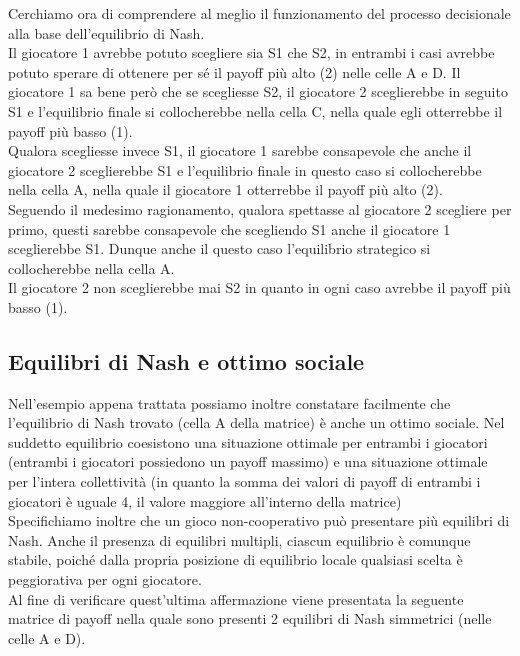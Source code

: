 \begin{flushleft}
Cerchiamo ora di comprendere al meglio il funzionamento del processo decisionale alla base dell'equilibrio di Nash.\\
Il giocatore 1 avrebbe potuto scegliere sia S1 che S2, in entrambi i casi avrebbe potuto sperare di ottenere per sé il payoff più alto (2) nelle celle A e D. Il giocatore 1 sa bene però che se scegliesse S2, il giocatore 2 sceglierebbe in seguito S1 e l'equilibrio finale si collocherebbe nella cella C, nella quale egli otterrebbe il payoff più basso (1).\\
Qualora scegliesse invece S1, il giocatore 1 sarebbe consapevole che anche il giocatore 2 sceglierebbe S1 e l'equilibrio finale in questo caso si collocherebbe nella cella A, nella quale il giocatore 1 otterrebbe il payoff più alto (2).\\
Seguendo il medesimo ragionamento, qualora spettasse al giocatore 2 scegliere per primo, questi sarebbe consapevole che scegliendo S1 anche il giocatore 1 sceglierebbe S1. Dunque anche il questo caso l'equilibrio strategico si collocherebbe nella cella A.\\
Il giocatore 2 non sceglierebbe mai S2 in quanto in ogni caso avrebbe il payoff più basso (1).\newline

\subsection{Equilibri di Nash e ottimo sociale}
Nell'esempio appena trattata possiamo inoltre constatare facilmente che l'equilibrio di Nash trovato (cella A della matrice) è anche un ottimo sociale. Nel suddetto equilibrio coesistono una situazione ottimale per entrambi i giocatori (entrambi i giocatori possiedono un payoff massimo) e una situazione ottimale per l'intera collettività (in quanto la somma dei valori di payoff di entrambi i giocatori è uguale 4, il valore maggiore all'interno della matrice)\\
Specifichiamo inoltre che un gioco non-cooperativo può presentare più equilibri di Nash. Anche il presenza di equilibri multipli, ciascun equilibrio è comunque stabile, poiché dalla propria posizione di equilibrio locale qualsiasi scelta è peggiorativa per ogni giocatore.\\
Al fine di verificare quest'ultima affermazione viene presentata la seguente matrice di payoff nella quale sono presenti 2 equilibri di Nash simmetrici (nelle celle A e D).\\


\end{flushleft}

